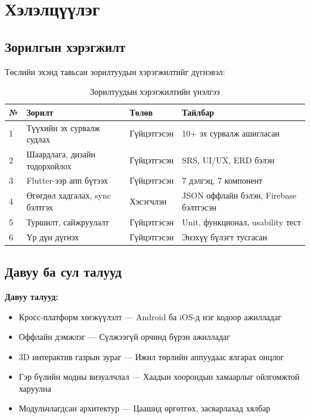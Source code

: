 \section{Хэлэлцүүлэг}

\subsection{Зорилгын хэрэгжилт}

Төслийн эхэнд тавьсан зорилтуудын хэрэгжилтийг дүгнэвэл:

\begin{table}[htbp]
\centering
\begin{tabular}{|p{0.8cm}|p{5.5cm}|p{2cm}|p{5cm}|}
\hline
\textbf{№} & \textbf{Зорилт} & \textbf{Төлөв} & \textbf{Тайлбар} \\
\hline
1 & Түүхийн эх сурвалж судлах & Гүйцэтгэсэн & 10+ эх сурвалж ашигласан \\
\hline
2 & Шаардлага, дизайн тодорхойлох & Гүйцэтгэсэн & SRS, UI/UX, ERD бэлэн \\
\hline
3 & Flutter-ээр апп бүтээх & Гүйцэтгэсэн & 7 дэлгэц, 7 компонент \\
\hline
4 & Өгөгдөл хадгалах, sync бэлтгэх & Хэсэгчлэн & JSON оффлайн бэлэн, Firebase бэлтгэсэн \\
\hline
5 & Туршилт, сайжруулалт & Гүйцэтгэсэн & Unit, функционал, usability тест \\
\hline
6 & Үр дүн дүгнэх & Гүйцэтгэсэн & Энэхүү бүлэгт тусгасан \\
\hline
\end{tabular}
\caption{Зорилтуудын хэрэгжилтийн үнэлгээ}
\label{tab:goals_eval}
\end{table}

\subsection{Давуу ба сул талууд}

\textbf{Давуу талууд:}
\begin{itemize}
	\item Кросс-платформ хөгжүүлэлт — Android ба iOS-д нэг кодоор ажилладаг
	\item Оффлайн дэмжлэг — Сүлжээгүй орчинд бүрэн ажилладаг
	\item 3D интерактив газрын зураг — Ижил төрлийн аппуудаас ялгарах онцлог
	\item Гэр бүлийн модны визуалчлал — Хаадын хоорондын хамаарлыг ойлгомжтой харуулна
	\item Модульчлагдсан архитектур — Цаашид өргөтгөх, засварлахад хялбар
\end{itemize}

